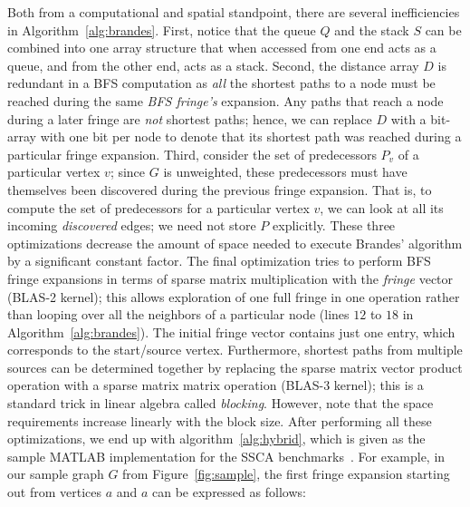 %
Both from a computational and spatial standpoint, there are several
inefficiencies in Algorithm~\ref{alg:brandes}.
%
First, notice that the queue $Q$ and the stack $S$ can be combined into one
array structure that when accessed from one end acts as a queue, and from the
other end, acts as a stack.
%
Second, the distance array $D$ is redundant in a BFS computation as
\textit{all} the shortest paths to a node must be reached during the same
\textit{BFS fringe's} expansion.
%
Any paths that reach a node during a later fringe are \textit{not} shortest
paths; hence, we can replace $D$ with a bit-array with one bit per node to
denote that its shortest path was reached during a particular fringe
expansion.
%
Third, consider the set of predecessors $P_v$ of a particular vertex $v$; since
$G$ is unweighted, these predecessors must have themselves been discovered 
during the previous fringe expansion.
%
That is, to compute the set of predecessors for a particular vertex $v$, we can
look at all its incoming \textit{discovered} edges; we need not store $P$ 
explicitly.
%
These three optimizations decrease the amount of space needed to execute
Brandes' algorithm by a significant constant factor.
%
The final optimization tries to perform BFS fringe expansions in terms of
sparse matrix multiplication with the \textit{fringe} vector (BLAS-2 kernel);
this allows exploration of one full fringe in one operation rather than
looping over all the neighbors of a particular node (lines $12$ to $18$ in
Algorithm~\ref{alg:brandes}).
%
The initial fringe vector contains just one entry, which corresponds to the 
start/source vertex.
%
Furthermore, shortest paths from multiple sources can be determined together by
replacing the sparse matrix vector product operation with a sparse matrix
matrix operation (BLAS-3 kernel); this is a standard trick in linear algebra
called \textit{blocking}.
%
However, note that the space requirements increase linearly with the block 
size.
%
After performing all these optimizations, we end up with
algorithm~\ref{alg:hybrid}, which is given as the sample MATLAB implementation
for the SSCA benchmarks~\cite{ssca_matlab}.
%
For example, in our sample graph $G$ from Figure~\ref{fig:sample}, the first 
fringe expansion starting out from vertices $a$ and $a$ can be expressed as
follows:

